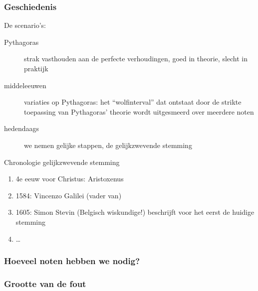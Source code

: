 \documentclass[compress, darktitle, framenumber, totalframenumber]{beamer}
\begin{document}
\begin{frame}
  \frametitle{Geschiedenis}

  De scenario's:
  \begin{description}
    \item[Pythagoras] strak vasthouden aan de perfecte verhoudingen, goed in theorie, slecht in praktijk
    \item[middeleeuwen] variaties op Pythagoras: het ``wolfinterval'' dat ontstaat door de strikte toepassing van Pythagoras' theorie wordt uitgesmeerd over meerdere noten
    \item[hedendaags] we nemen gelijke stappen, de \alert{gelijkzwevende stemming}
  \end{description}
  \pause
  \begin{block}{Chronologie gelijkzwevende stemming}
    \begin{enumerate}
      \item 4e eeuw voor Christus: Aristoxenus
      \item 1584: Vincenzo Galilei (vader van)
      \item 1605: Simon Stevin (Belgisch wiskundige!) beschrijft voor het eerst de huidige stemming
      \item \ldots
    \end{enumerate}
  \end{block}
\end{frame}

\begin{frame}
  \frametitle{Hoeveel noten hebben we nodig?}

  \begin{center}
  \end{center}
\end{frame}

\begin{frame}
  \frametitle{Grootte van de fout}

  \begin{center}
  \end{center}
\end{frame}
\end{document}
